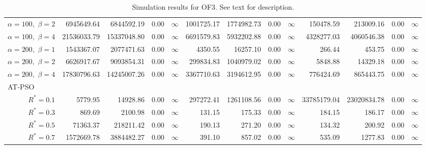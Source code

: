 \documentclass[12pt]{article}
\begin{document}
\begin{table}[ht]
{\begin{tabular}{r|rrrr|rrrr|rrrr}
  $\alpha = 100,$ $\beta =2$ & 6945649.64 & 6844592.19 & 0.00 & $\infty$ & 1001725.17 & 1774982.73 & 0.00 & $\infty$ & 150478.59 & 213009.16 & 0.00 & $\infty$ \\ 
  $\alpha = 100,$ $\beta =4$ & 21536033.79 & 15337048.80 & 0.00 & $\infty$ & 6691579.83 & 5932202.88 & 0.00 & $\infty$ & 4328277.03 & 4060546.38 & 0.00 & $\infty$ \\ 
  $\alpha = 200,$ $\beta =1$ & 1543367.07 & 2077471.63 & 0.00 & $\infty$ & 4350.55 & 16257.10 & 0.00 & $\infty$ & 266.44 & 453.75 & 0.00 & $\infty$ \\ 
  $\alpha = 200,$ $\beta =2$ & 6626917.67 & 9093854.31 & 0.00 & $\infty$ & 299834.83 & 1040979.02 & 0.00 & $\infty$ & 5848.88 & 14329.18 & 0.00 & $\infty$ \\ 
  $\alpha = 200,$ $\beta =4$ & 17830796.63 & 14245007.26 & 0.00 & $\infty$ & 3367710.63 & 3194612.95 & 0.00 & $\infty$ & 776424.69 & 865443.75 & 0.00 & $\infty$ \\ 
\hline
\multicolumn{1}{l|}{AT-PSO} &&&&&&&&&&&&\\
  $R^* = 0.1$ & 5779.95 & 14928.86 & 0.00 & $\infty$ & 297272.41 & 1261108.56 & 0.00 & $\infty$ & 33785179.04 & 23020834.78 & 0.00 & $\infty$ \\ 
  $R^* = 0.3$ & 869.69 & 2100.98 & 0.00 & $\infty$ & 131.15 & 175.33 & 0.00 & $\infty$ & 184.15 & 186.17 & 0.00 & $\infty$ \\ 
  $R^* = 0.5$ & 71363.37 & 218211.42 & 0.00 & $\infty$ & 190.13 & 271.20 & 0.00 & $\infty$ & 134.32 & 200.92 & 0.00 & $\infty$ \\ 
  $R^* = 0.7$ & 1572669.78 & 3884482.27 & 0.00 & $\infty$ & 391.10 & 857.02 & 0.00 & $\infty$ & 535.09 & 1277.83 & 0.00 & $\infty$ \\ 
   \hline
\end{tabular}
}
\caption{Simulation results for OF3. See text for description.}
\label{tab:psosim3}
\end{table}
\end{document}
